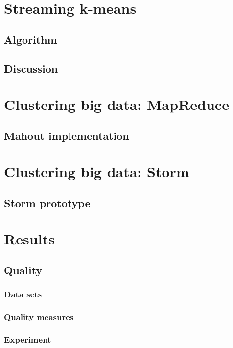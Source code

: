 \documentclass{article}
\begin{document}
\section{Streaming k-means}

\subsection{Algorithm}

\subsection{Discussion}

\section{Clustering big data: MapReduce}

\subsection{Mahout implementation}

\section{Clustering big data: Storm}

\subsection{Storm prototype}

\section{Results}

\subsection{Quality}

\subsubsection{Data sets}

\subsubsection{Quality measures}

\subsubsection{Experiment}
\end{document}
